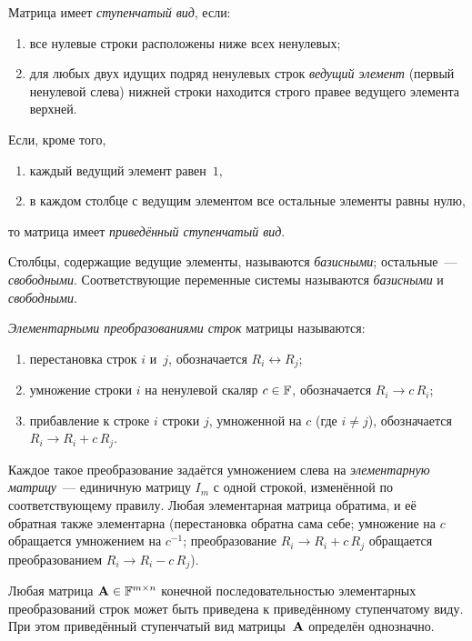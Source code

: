 \begin{definition}
\label{def:gauss-ref}
Матрица имеет \emph{ступенчатый вид}, если:
\begin{enumerate}[label=(\alph*)]
  \item все нулевые строки расположены ниже всех ненулевых;
  \item для любых двух идущих подряд ненулевых строк \emph{ведущий
        элемент} (первый ненулевой слева) нижней строки находится
        строго правее ведущего элемента верхней.
\end{enumerate}
Если, кроме того,
\begin{enumerate}[label=(\alph*),resume]
  \item каждый ведущий элемент равен~$1$,
  \item в каждом столбце с ведущим элементом все остальные элементы
        равны нулю,
\end{enumerate}
то матрица имеет \emph{приведённый ступенчатый вид}.

Столбцы, содержащие ведущие элементы, называются \emph{базисными};
остальные~--- \emph{свободными}. Соответствующие переменные системы
называются \emph{базисными} и \emph{свободными}.
\end{definition}

\begin{definition}
\label{def:gauss-ero}
\emph{Элементарными преобразованиями строк} матрицы называются:
\begin{enumerate}[label=(\Roman*)]
  \item перестановка строк $i$ и~$j$, обозначается
        $R_i \leftrightarrow R_j$;
  \item умножение строки $i$ на ненулевой скаляр $c \in \mathbb{F}$,
        обозначается $R_i \to c\,R_i$;
  \item прибавление к строке $i$ строки $j$, умноженной на $c$
        (где $i \neq j$), обозначается $R_i \to R_i + c\,R_j$.
\end{enumerate}
Каждое такое преобразование задаётся умножением слева на
\emph{элементарную матрицу}~--- единичную матрицу $I_m$ с одной
строкой, изменённой по соответствующему правилу. Любая элементарная
матрица обратима, и её обратная также элементарна (перестановка
обратна сама себе; умножение на $c$ обращается умножением на $c^{-1}$;
преобразование $R_i \to R_i + c\,R_j$ обращается преобразованием
$R_i \to R_i - c\,R_j$).
\end{definition}

\begin{theorem}[Гаусс]
\label{thm:gauss-rref}
Любая матрица $\mathbf{A} \in \mathbb{F}^{m \times n}$ конечной последовательностью
элементарных преобразований строк может быть приведена к приведённому
ступенчатому виду. При этом приведённый ступенчатый вид матрицы~$\mathbf{A}$
определён однозначно.
\end{theorem}

